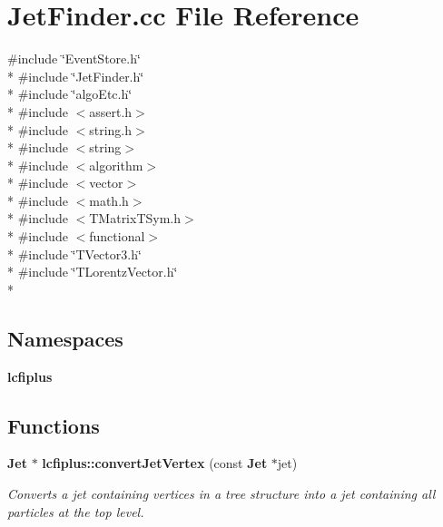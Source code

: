 \section{Jet\-Finder.\-cc File Reference}
\label{JetFinder_8cc}
{\ttfamily \#include \char`\"{}Event\-Store.\-h\char`\"{}}\\*
{\ttfamily \#include \char`\"{}Jet\-Finder.\-h\char`\"{}}\\*
{\ttfamily \#include \char`\"{}algo\-Etc.\-h\char`\"{}}\\*
{\ttfamily \#include $<$assert.\-h$>$}\\*
{\ttfamily \#include $<$string.\-h$>$}\\*
{\ttfamily \#include $<$string$>$}\\*
{\ttfamily \#include $<$algorithm$>$}\\*
{\ttfamily \#include $<$vector$>$}\\*
{\ttfamily \#include $<$math.\-h$>$}\\*
{\ttfamily \#include $<$T\-Matrix\-T\-Sym.\-h$>$}\\*
{\ttfamily \#include $<$functional$>$}\\*
{\ttfamily \#include \char`\"{}T\-Vector3.\-h\char`\"{}}\\*
{\ttfamily \#include \char`\"{}T\-Lorentz\-Vector.\-h\char`\"{}}\\*
\subsection*{Namespaces}
\begin{DoxyCompactItemize}
\item 
{\bf lcfiplus}
\end{DoxyCompactItemize}
\subsection*{Functions}
\begin{DoxyCompactItemize}
\item 
{\bf Jet} $\ast$ {\bf lcfiplus\-::convert\-Jet\-Vertex} (const {\bf Jet} $\ast$jet)
\begin{DoxyCompactList}\small\item\em Converts a jet containing vertices in a tree structure into a jet containing all particles at the top level. \end{DoxyCompactList}\end{DoxyCompactItemize}
